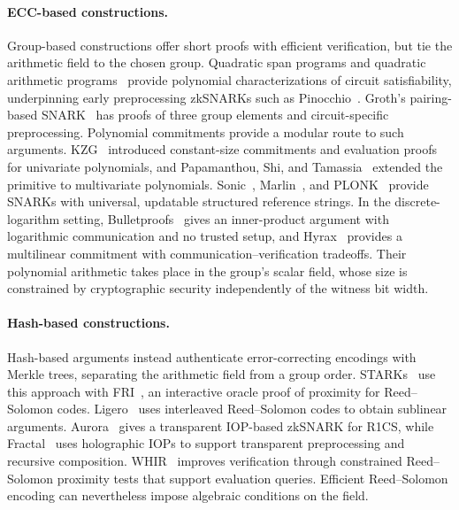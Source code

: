\paragraph{ECC-based constructions.}
Group-based constructions offer short proofs with efficient
verification, but tie the arithmetic field to the chosen group.
Quadratic span programs and quadratic arithmetic
programs~\cite{eurocrypt/GennaroGP013} provide polynomial
characterizations of circuit satisfiability, underpinning early
preprocessing zkSNARKs such as Pinocchio~\cite{cacm/ParnoHG016}.
Groth's pairing-based SNARK~\cite{eurocrypt/Groth16} has proofs
of three group elements and circuit-specific preprocessing.
Polynomial commitments provide a modular route to such arguments.
KZG~\cite{asiacrypt/KateZG10} introduced constant-size commitments
and evaluation proofs for univariate polynomials, and Papamanthou,
Shi, and Tamassia~\cite{tcc/PapamanthouST13} extended the primitive
to multivariate polynomials.
Sonic~\cite{ccs/MallerBKM19}, Marlin~\cite{eurocrypt/ChiesaHMMVW20},
and PLONK~\cite{iacr/GabizonWC19} provide SNARKs with universal,
updatable structured reference strings.
In the discrete-logarithm setting,
Bulletproofs~\cite{sp/BunzBBPWM18} gives an inner-product argument
with logarithmic communication and no trusted setup, and
Hyrax~\cite{sp/WahbyTSTW18} provides a multilinear commitment with
communication--verification tradeoffs.
Their polynomial arithmetic takes place in the group's scalar
field, whose size is constrained by cryptographic security
independently of the witness bit width.

\paragraph{Hash-based constructions.}
Hash-based arguments instead authenticate error-correcting encodings
with Merkle trees, separating the arithmetic field from a group
order. STARKs~\cite{iacr/Ben-SassonBHR18} use this approach
with FRI~\cite{icalp/Ben-SassonBHR18}, an interactive oracle proof
of proximity for Reed--Solomon codes.
Ligero~\cite{dcc/AmesHIV23} uses interleaved Reed--Solomon codes
to obtain sublinear arguments.
Aurora~\cite{eurocrypt/Ben-SassonCRSVW19} gives a transparent
IOP-based zkSNARK for R1CS, while
Fractal~\cite{eurocrypt/ChiesaOS20} uses holographic IOPs to
support transparent preprocessing and recursive composition.
WHIR~\cite{eurocrypt/ArnonCFY25} improves verification through
constrained Reed--Solomon proximity tests that support evaluation
queries. Efficient Reed--Solomon encoding can nevertheless impose
algebraic conditions on the field.

